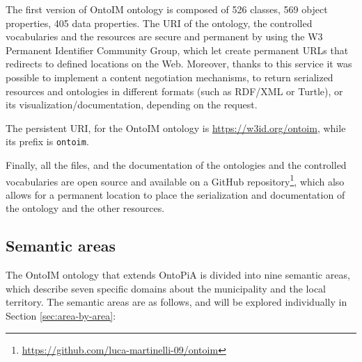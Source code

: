The first version of \ac{OntoIM} ontology is composed of 526 classes, 569 object properties, 405 data properties. The \ac{URI} of the ontology, the controlled vocabularies and the resources are secure and permanent by using the  W3 Permanent Identifier Community Group, which let create permanent \acp{URL} that redirects to defined locations on the Web. Moreover, thanks to this service it was possible to implement a content negotiation mechanisms, to return serialized resources and ontologies in different formats (such as \ac{RDF}/\ac{XML} or Turtle), or its visualization/documentation, depending on the request.

The persistent \ac{URI}, for the \ac{OntoIM} ontology is \url{https://w3id.org/ontoim}, while its prefix is \verb#ontoim#.

Finally, all the files, and the documentation of the ontologies and the controlled vocabularies are open source and available on a GitHub repository\footnote{\url{https://github.com/luca-martinelli-09/ontoim}}, which also allows for a permanent location to place the serialization and documentation of the ontology and the other resources.

\subsection{Semantic areas}
\label{subsec:semantic-areas}

The \ac{OntoIM} ontology that extends OntoPiA is divided into nine semantic areas, which describe seven specific domains about the municipality and the local territory. The semantic areas are as follows, and will be explored individually in Section \ref{sec:area-by-area}:

